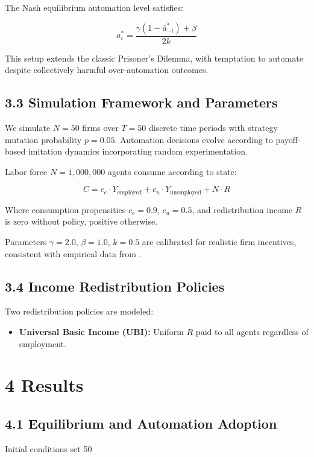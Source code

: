 \documentclass[11pt]{amsart}
\begin{document}
The Nash equilibrium automation level satisfies:


\[
a_i^* = \frac{\gamma (1 - \bar{a}_{-i}^*) + \beta}{2k}
\]

This setup extends the classic Prisoner’s Dilemma, with temptation to automate despite collectively harmful over-automation outcomes.


\hypertarget{x-3.3-simulation-framework-and-parameters}{\subsection{3.3 Simulation Framework and Parameters}}
We simulate $N=50$ firms over $T=50$ discrete time periods with strategy mutation probability $p=0.05$. Automation decisions evolve according to payoff-based imitation dynamics incorporating random experimentation.


Labor force $N=1,000,000$ agents consume according to state:


\[
C = c_e \cdot Y_{\text{employed}} + c_u \cdot Y_{\text{unemployed}} + N \cdot R
\]

Where consumption propensities $c_e = 0.9$, $c_u = 0.5$, and redistribution income $R$ is zero without policy, positive otherwise.


Parameters $\gamma=2.0$, $\beta=1.0$, $k=0.5$ are calibrated for realistic firm incentives, consistent with empirical data from \cite{StanfordAI2025}.


\hypertarget{x-3.4-income-redistribution-policies}{\subsection{3.4 Income Redistribution Policies}}
Two redistribution policies are modeled:


\begin{itemize}

\item \textbf{Universal Basic Income (UBI):} Uniform $R$ paid to all agents regardless of employment.

\end{itemize}


\hypertarget{x-4-results}{\section{4 Results}}
\hypertarget{x-4.1-equilibrium-and-automation-adoption}{\subsection{4.1 Equilibrium and Automation Adoption}}
Initial conditions set 50%
\end{document}
